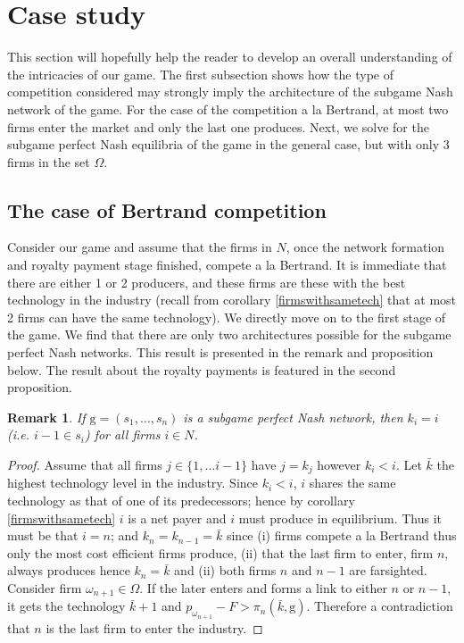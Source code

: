 \documentclass{article}
\newtheorem{remark}{Remark}
\begin{document}
\section{Case study}
This section will hopefully help the reader to develop an overall understanding of the intricacies of our game. The first subsection shows how the type of competition considered may strongly imply the architecture of the subgame Nash network of the game. For the case of the competition a la Bertrand, at most two firms enter the market and only the last one produces. Next, we solve for the subgame perfect Nash equilibria of the game in the general case, but with only 3 firms in the set $\Omega$.
    
\subsection{The case of Bertrand competition}
Consider our game and assume that the firms in $N$, once the network formation and royalty payment stage finished, compete a la Bertrand. It is immediate that there are either 1 or 2 producers, and these firms are these with the best technology in the industry (recall from corollary \ref{firmswithsametech} that at most 2 firms can have the same technology). We directly move on to the first stage of the game. We find that there are only two architectures possible for the subgame perfect Nash networks. This result is presented in the remark and proposition below. The result about the royalty payments is featured in the second proposition. \\

\begin{remark}\label{bertrand is a chain}
If $\text{g}=(s_1,\ldots, s_n)$ is a subgame perfect Nash network, then $k_i=i$ (i.e. $i-1\in s_i$) for all firms $i\in N$.
\end{remark} 
\begin{proof}
Assume that all firms $j\in \{1,\ldots i-1\}$ have $j=k_j$ however $k_i<i$. Let $\bar{k}$ the highest technology level in the industry. Since $k_i<i$, $i$ shares the same technology as that of one of its predecessors; hence by corollary \ref{firmswithsametech} $i$ is a net payer and $i$ must produce in equilibrium. Thus it must be that $i=n$; and $k_n=k_{n-1}=\bar{k}$ since (i) firms compete a la Bertrand thus only the most cost efficient firms produce, (ii) that the last firm to enter, firm $n$, always produces hence $k_n=\bar{k}$ and (ii) both firms $n$ and $n-1$ are farsighted. Consider firm $\omega_{n+1}\in \Omega$. If the later enters and forms a link to either $n$ or $n-1$, it gets the technology $\bar{k}+1$ and $p_{\omega_{n+1}}-F>\pi_n(\bar{k},\text{g})$. Therefore a contradiction that $n$ is the last firm to enter the industry.    
\end{proof}
\end{document}
